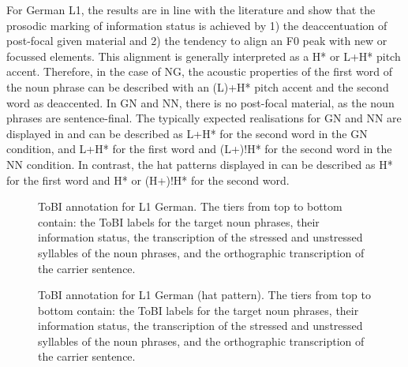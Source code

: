 For German L1, the results are in line with the literature and show that the prosodic marking of information status is achieved by 1) the deaccentuation of post-focal given material and 2) the tendency to align an F0 peak with new or focussed elements. This alignment is generally interpreted as a H* or L+H* pitch accent. Therefore, in the case of NG, the acoustic properties of the first word of the noun phrase can be described with an (L)+H* pitch accent and the second word as deaccented. In GN and NN, there is no post-focal material, as the noun phrases are sentence-final. The typically expected realisations for GN and NN are displayed in  and can be described as L+H* for the second word in the GN condition, and L+H* for the first word and (L+)!H* for the second word in the NN condition. In contrast, the hat patterns displayed in  can be described as H* for the first word and H* or (H+)!H* for the second word.

\begin{figure}





\caption{\label{fig:2.28} ToBI annotation for L1 German. The tiers from top to bottom contain: the ToBI labels for the target noun phrases, their information status, the transcription of the stressed and unstressed syllables of the noun phrases, and the orthographic transcription of the carrier sentence.}
\end{figure}


\begin{figure}


\caption{\label{fig:2.29} ToBI annotation for L1 German (hat pattern). The tiers from top to bottom contain: the ToBI labels for the target noun phrases, their information status, the transcription of the stressed and unstressed syllables of the noun phrases, and the orthographic transcription of the carrier sentence.}
\end{figure}

